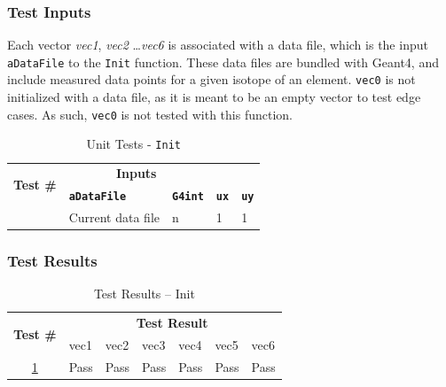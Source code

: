 \documentclass[12pt]{article}
\newcounter{TestCounter}
\begin{document}
	\subsubsection{Test Inputs}
		Each vector \emph{vec1}, \emph{vec2} \ldots \emph{vec6} is associated with a data file, which is the input \texttt{aDataFile} to
		the \texttt{Init} function. These data files are bundled with Geant4, and include measured data points for 
		a given isotope of an element. \texttt{vec0} is not initialized with a data file, as it is meant to be an empty vector to test edge cases.
		As such, \texttt{vec0} is not tested with this function.
		\begin{table}[H]
		\centering
		\caption{Unit Tests - \texttt{Init}}\label{Init_unit}
		\begin{tabular}{lllll}
		\toprule
		\multirow{2}{*}{\bf Test \#}  & \multicolumn{2}{c}{\bf Inputs}\\
		& \bf \texttt{aDataFile} & \bf \texttt{G4int} & \bf \texttt{ux} & \bf \texttt{uy}\\\midrule
		{TestCounter}\arabic{TestCounter}\label{Init_0} & Current data file & n & 1 & 1\\
		\bottomrule
		\end{tabular}
		\end{table}
	\subsubsection{Test Results}
		\begin{table}[H]
		\centering
		\caption{Test Results -- Init}\label{Init_acc}
		\begin{tabular}{cllllll}
		\toprule
		\multirow{2}{*}{\bf Test \#} & \multicolumn{6}{c}{\bf Test Result}\\
		& vec1 & vec2 & vec3 & vec4 & vec5 & vec6\\\midrule
		\ref{Init_0} & Pass & Pass & Pass & Pass & Pass & Pass\\
		\bottomrule
		\end{tabular}
		\end{table}
\end{document}
